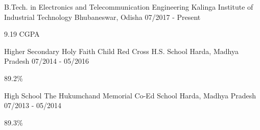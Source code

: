 
\vspace{1.5mm}
\begin{cventries}
  \cventry
    {B.Tech. in  Electronics and Telecommunication Engineering} %
    {Kalinga Institute of Industrial Technology} %
    {Bhubaneswar, Odisha} %
    {07/2017 - Present} %
    {
      \begin{cvitems} %
        \item {9.19 CGPA}
      \end{cvitems}
    }
    \vspace{1mm}
    
\end{cventries}

\begin{cventries}
  \cventry
    {Higher Secondary} %
    {Holy Faith Child Red Cross H.S. School} %
    {Harda, Madhya Pradesh} %
    {07/2014 - 05/2016} %
    {
      \begin{cvitems} %
        \item {89.2\%}
      \end{cvitems}
    }
    \vspace{1mm}
    
\end{cventries}

\begin{cventries}
  \cventry
    {High School} %
    {The Hukumchand Memorial Co-Ed School} %
    {Harda, Madhya Pradesh} %
    {07/2013 - 05/2014} %
    {
      \begin{cvitems} %
        \item {89.3\%}
      \end{cvitems}
    }

\end{cventries}